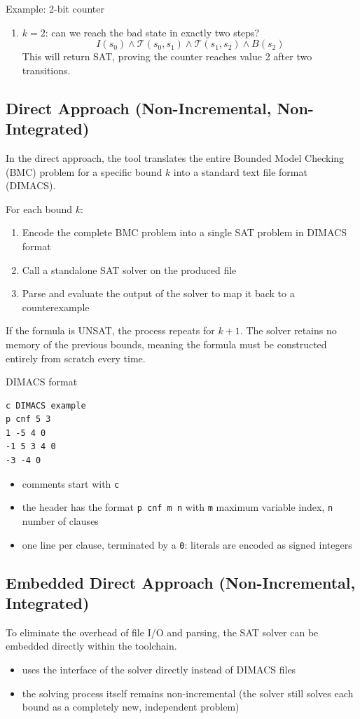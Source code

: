 \documentclass[a4paper, 11pt]{report}
\begin{document}
\begin{gframe}{Example: 2-bit counter}
\begin{enumerate}
    \item \textbf{$k=2$}: can we reach the bad state in exactly two steps?
    $$ I(s_0) \wedge \mathcal{T}(s_0, s_1) \wedge \mathcal{T}(s_1, s_2) \wedge B(s_2) $$
    This will return SAT, proving the counter reaches value 2 after two transitions.
\end{enumerate}
\end{gframe}

\subsection{Direct Approach (Non-Incremental, Non-Integrated)}
In the direct approach, the tool translates the entire Bounded Model Checking (BMC) problem for a specific bound $k$ into a standard text file format (DIMACS). 

For each bound $k$:
\begin{enumerate}
    \item Encode the complete BMC problem into a single SAT problem in DIMACS format
    \item Call a standalone SAT solver on the produced file
    \item Parse and evaluate the output of the solver to map it back to a counterexample
\end{enumerate}

If the formula is UNSAT, the process repeats for $k+1$. The solver retains no memory of the previous bounds, meaning the formula must be constructed entirely from scratch every time.

\begin{gframe}{DIMACS format}
    \begin{lstlisting}
c DIMACS example
p cnf 5 3
1 -5 4 0
-1 5 3 4 0
-3 -4 0
    \end{lstlisting}
    \vspace{-1em}
    \begin{itemize}
        \item comments start with \texttt{c}
        \item the header has the format \texttt{p cnf m n} with \texttt{m} maximum variable index, \texttt{n} number of clauses
        \item one line per clause, terminated by a \texttt{0}: literals are encoded as signed integers
    \end{itemize}
\end{gframe}

\subsection{Embedded Direct Approach (Non-Incremental, Integrated)}
To eliminate the overhead of file I/O and parsing, the SAT solver can be embedded directly within the toolchain.
\begin{itemize}
    \item uses the interface of the solver directly instead of DIMACS files
    \item the solving process itself remains non-incremental (the solver still solves each bound as a completely new, independent problem)
\end{itemize}
\end{document}
